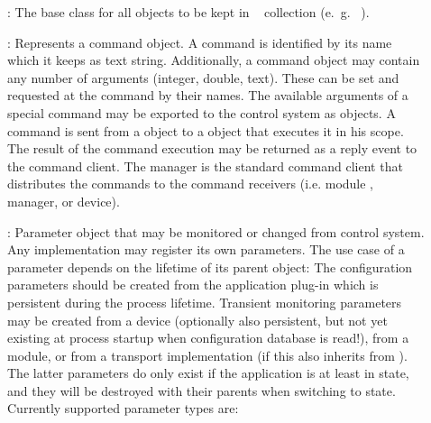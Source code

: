 \begin{description}
\item[] :  The base class for all objects to be kept in \dabc~ collection (e.~g.~ ).
\item[] : 
Represents a command object. A command 
   is identified by its name which it keeps as text string. Additionally, 
   a command object may contain any number of arguments (integer, double, text). 
   These can be set and requested at the command by their names. 
   The available arguments of a special command may be exported to the control 
   system as  objects. A command is sent from a 
    object to a  object
    that executes it in his scope. 
   The result of the command execution may be returned as a reply event to 
   the command client. The manager is the standard command client 
   that distributes the commands to the command receivers 
   (i.e. module , manager, or device). 
\item[] :   
Parameter object that may be monitored or 
   changed from control system. Any  implementation 
   may register its own parameters. The use case of a parameter 
   depends on the lifetime of its parent object: The configuration 
   parameters should be created from the application plug-in which 
   is persistent during the process lifetime. Transient monitoring parameters 
   may be created from a device (optionally also persistent, but not 
   yet existing at process startup when configuration database is read!), 
   from a module, or from a transport implementation (if this 
   also inherits from ). The latter parameters 
   do only exist if the application is at least in  state, and 
   they will be destroyed with their parents when switching to  state. 
   Currently supported parameter types are:
\end{description}
